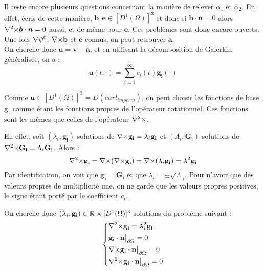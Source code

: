 Il reste encore plusieurs questions concernant la manière de relever $\alpha_1$ et $\alpha_2$. En effet, écris de cette manière, $\bm{b},\bm{e}\in [D^1(\Omega)]^3$ et donc si $\bm{b}\cdot\bm{n}=0$ alors ${\nabla^2\times}\bm{b}\cdot\bm{n}=0$ aussi, et de même pour $\bm{e}$. Ces problèmes sont donc encore ouverts.\\

Une fois ${\nabla}\psi^0$, ${\nabla\times} \mathbf{b}$ et $\bm{e}$ connus, on peut retrouver $\mathbf{a}$.\\

On cherche donc $\mathbf{u}=\mathbf{v}-\mathbf{a}$, et en utilisant la décomposition de Galerkin généralisée, on a :
\begin{equation}\label{u}
\mathbf{u}(t,\cdot) = \sum_{i=1}^{\infty} c_i(t)\mathbf{g_i}(\cdot)
\end{equation}

Comme $\mathbf{u}\in [D^1(\Omega)]^3=D(curl_{imperm})$, on peut choisir les fonctions de base
$\mathbf{g_i}$ comme étant les fonctions propres de l'opérateur rotationnel. Ces
fonctions sont les mêmes que celles de l'opérateur ${\nabla^2\times}$.

En effet, soit $(\lambda_i,\mathbf{g_i})$ solutions de ${\nabla\times} \mathbf{g_i} = \lambda_i\mathbf{g_i}$ et $(\Lambda_i,\mathbf{G_i})$ solutions de ${\nabla^2\times} \mathbf{G_i} = \Lambda_i\mathbf{G_i}$. Alors :
\[ {\nabla^2\times} \mathbf{g_i} = {\nabla\times}({\nabla\times} \mathbf{g_i})={\nabla\times}(\lambda_i\mathbf{g_i})=\lambda^2\mathbf{g_i} \]
Par identification, on voit que $\mathbf{g_i}=\mathbf{G_i}$ et que $\lambda_i=\pm\sqrt\Lambda_i$. Pour n'avoir que des valeurs propres de multiplicité une, on ne garde que les valeurs propres positives, le signe étant porté par le coefficient $c_i$.

On cherche donc $(\lambda_i,\mathbf{g_i})\in{\mathbb{R}}\times [D^1(\Omega)]^3$ solutions du problème suivant :
\begin{equation}\label{curlcurl}
\left\{\begin{aligned}
&{\nabla^2\times}  \mathbf{g_i} = \lambda_i^2 \mathbf{g_i}\\
&\mathbf{g_i}\cdot \mathbf{n}{\big\rvert_{\partial\Omega}} = 0\\
&{\nabla\times} \mathbf{g_i}\cdot \mathbf{n}{\big\rvert_{\partial\Omega}} = 0\\
&{\nabla^2\times}  \mathbf{g_i}\cdot \mathbf{n}{\big\rvert_{\partial\Omega}} = 0
\end{aligned}\right.
\end{equation}

